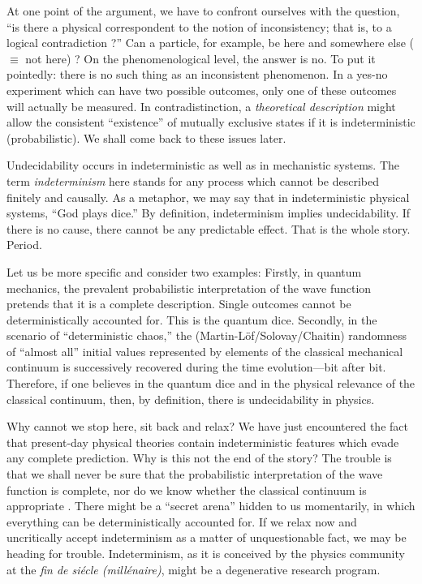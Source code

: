 At one point of the argument, we have to confront ourselves with the
question, ``is there a physical correspondent to the notion of
inconsistency; that is, to a logical contradiction \cite{hilbert-i}?''
Can a particle, for example, be here  and somewhere else
($\equiv$ not here) \cite{coh-ds}?
On the  phenomenological level, the answer is no.
To put it pointedly: there is no such thing as an inconsistent
phenomenon.
In a yes-no experiment which can have two
possible outcomes, only one of these outcomes will actually be measured.
In contradistinction, a {\em theoretical description}
might allow the consistent ``existence'' of
mutually exclusive states
if it is
indeterministic (probabilistic).
We shall come back to these issues later.

Undecidability occurs in indeterministic as well as in mechanistic
systems. The term {\em indeterminism} here stands for any process which
cannot
be described finitely and causally. As a metaphor, we may say that in
indeterministic physical systems, ``God plays dice.''
By definition, indeterminism implies undecidability. If there is no
cause, there cannot be any predictable effect. That is the whole story.
Period.

Let us be more specific and consider two examples: Firstly, in quantum
mechanics, the prevalent
probabilistic interpretation of the
wave function pretends that it is a complete description.
Single outcomes cannot be deterministically accounted for. This is the
quantum dice.
Secondly, in the scenario of ``deterministic chaos,'' the
(Martin-L\"of/Solovay/Chaitin) randomness
of ``almost all''
initial values represented by
elements of the classical
mechanical continuum is successively recovered during the time
evolution---bit after bit.
Therefore, if one believes in the quantum dice and in the physical
relevance of the classical continuum, then, by definition, there is
undecidability in physics.

Why cannot we stop here, sit back and relax?
We have just encountered the fact that present-day physical theories
contain indeterministic features which evade any complete prediction.
Why is this not the end of the story?
The trouble is that
we shall never be sure that the probabilistic interpretation of the wave
function is complete, nor do we know whether the classical continuum is
appropriate
\cite{frank}.
There might be a ``secret arena'' hidden to us momentarily,
in which everything can be deterministically accounted for.
If we relax now and uncritically accept indeterminism as a matter of
unquestionable fact, we may be heading for trouble. Indeterminism,
as it is conceived by the physics community at the {\it fin de
si\'{e}cle
(mill\'{e}naire)}, might be a degenerative research program.

